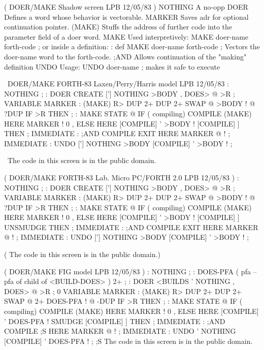 \setcounter{screen}{21}
\begin{Screen}
( DOER/MAKE   Shadow screen                      LPB 12/05/83 )
NOTHING   A no-opp
DOER      Defines a word whose behavior is vectorable.
MARKER    Saves adr for optional continuation pointer.
(MAKE)    Stuffs the address of further code into the
          parameter field of a doer word.
MAKE      Used interpretively:  MAKE doer-name  forth-code ;
          or inside a definition:
             : def   MAKE doer-name  forth-code ;
          Vectors the doer-name word to the forth-code.
;AND      Allows continuation of the "making" definition
UNDO      Usage:  UNDO doer-name ; makes it safe to execute




\end{Screen}

\begin{Screen}
\ DOER/MAKE   FORTH-83 Laxen/Perry/Harris model  LPB 12/05/83 
: NOTHING ;
: DOER   CREATE  ['] NOTHING  >BODY ,  DOES> @ >R ;
VARIABLE MARKER
: (MAKE)  R>  DUP 2+  DUP 2+  SWAP @  >BODY !
   @ ?DUP IF >R THEN ;
: MAKE   STATE @ IF ( compiling)
   COMPILE (MAKE)  HERE MARKER !  0 ,
   ELSE  HERE  [COMPILE] '  >BODY !
   [COMPILE] ]  THEN ;   IMMEDIATE
: ;AND   COMPILE EXIT  HERE MARKER @ ! ;   IMMEDIATE
: UNDO   ['] NOTHING  >BODY  [COMPILE] '  >BODY ! ;

\ The code in this screen is in the public domain.


\end{Screen}

\begin{Screen}
( DOER/MAKE   FORTH-83 Lab. Micro PC/FORTH 2.0   LPB 12/05/83 )
: NOTHING ;
: DOER   CREATE  ['] NOTHING  >BODY ,  DOES> @ >R ;
VARIABLE MARKER
: (MAKE)  R>  DUP 2+  DUP 2+  SWAP @  >BODY !
   @ ?DUP IF >R THEN ;
: MAKE   STATE @ IF ( compiling)
   COMPILE (MAKE)  HERE MARKER !  0 ,
   ELSE  HERE  [COMPILE] '  >BODY !
   [COMPILE] ] UNSMUDGE  THEN ;   IMMEDIATE
: ;AND   COMPILE EXIT  HERE MARKER @ ! ;   IMMEDIATE
: UNDO   ['] NOTHING  >BODY  [COMPILE] '  >BODY ! ;

( The code in this screen is in the public domain.)


\end{Screen}

\begin{Screen}
( DOER/MAKE   FIG model                          LPB 12/05/83 )
: NOTHING   ;
: DOES-PFA  ( pfa -- pfa of child of <BUILD-DOES> )   2+ ;
: DOER   <BUILDS  ' NOTHING ,  DOES> @ >R ;
0 VARIABLE MARKER
: (MAKE)  R>  DUP 2+  DUP 2+  SWAP @  2+ DOES-PFA !
   @ -DUP IF >R THEN ;
: MAKE  STATE @ IF ( compiling)
   COMPILE (MAKE)  HERE MARKER !  0 ,
   ELSE  HERE  [COMPILE] '  DOES-PFA !
   SMUDGE    [COMPILE] ] THEN ; IMMEDIATE
: ;AND   COMPILE ;S  HERE MARKER @ ! ;  IMMEDIATE
: UNDO   ' NOTHING  [COMPILE] '  DOES-PFA ! ;
;S
The code in this screen is in the public domain.

\end{Screen}


